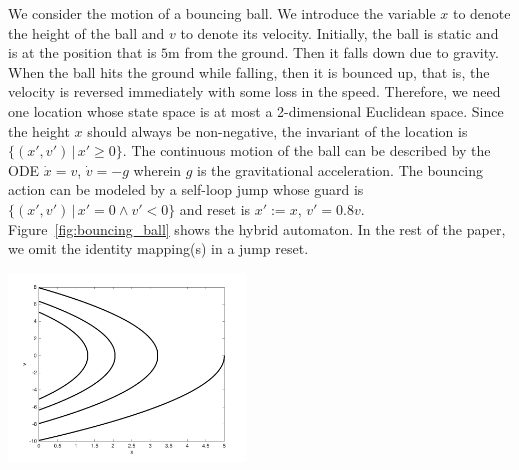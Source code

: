 \begin{example}
 We consider the motion of a bouncing ball. We introduce the variable $x$ to denote the height of the ball and $v$ to denote its velocity. Initially, the ball is static and is at the position that is $5$m from the ground. Then it falls down due to gravity. When the ball hits the ground while falling, then it is bounced up, that is, the velocity is reversed immediately with some loss in the speed. Therefore, we need one location whose state space is at most a 2-dimensional Euclidean space. Since the height $x$ should always be non-negative, the invariant of the location is $\{(x',v')\,|\,x' \geq 0\}$. The continuous motion of the ball can be described by the ODE $\dot{x} = v$, $\dot{v} = -g$ wherein $g$ is the gravitational acceleration. The bouncing action can be modeled by a self-loop jump whose guard is $\{(x',v')\,|\,x' = 0 \wedge v' < 0\}$ and reset is $x' := x$, $v' = 0.8v$. Figure~\ref{fig:bouncing_ball} shows the hybrid automaton. In the rest of the paper, we omit the identity mapping(s) in a jump reset.
\end{example}

\begin{minipage}{0.48\textwidth}
 \centering
 \label{fig:bouncing_ball}
\end{minipage}
\hspace{1ex}
\begin{minipage}{0.48\textwidth}
 \centering
 \includegraphics[height = 5cm]{images/bouncing_ball}
 \label{fig:execution}
\end{minipage}


